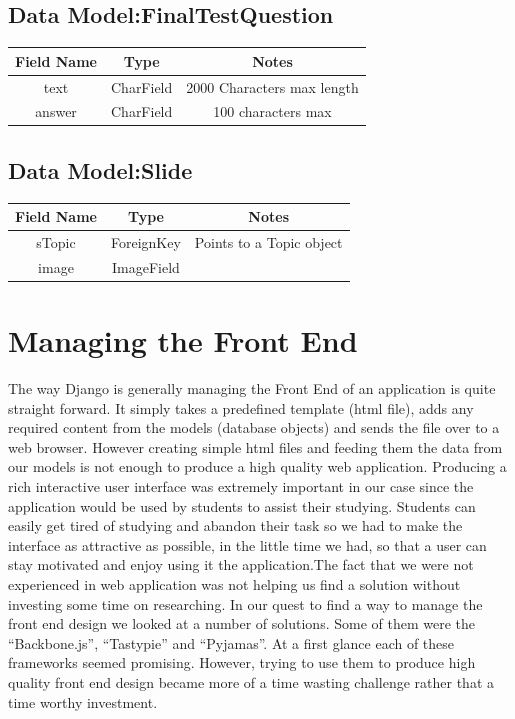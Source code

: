 \documentclass{l3proj}
\begin{document}
{\subsection{Data Model:FinalTestQuestion}
\begin{tabular}{|c|c|c|}
\hline \textbf{Field Name} & \textbf{Type} & \textbf{Notes}\\
\hline text & CharField & 2000 Characters max length \\ 
\hline answer & CharField & 100 characters max \\ \hline
\end{tabular}

\subsection{Data Model:Slide}
\begin{tabular}{|c|c|c|}
\hline \textbf{Field Name} & \textbf{Type} & \textbf{Notes}\\
\hline sTopic & ForeignKey & Points to a Topic object \\ 
\hline image & ImageField &  \\ \hline
\end{tabular}

\section{Managing the Front End}
The way Django is generally managing the Front End of an application is quite 
straight forward. It simply takes a predefined template (html file), adds any required 
content from the models (database objects) and sends the file over to a web browser. 
However creating simple html files and feeding them the data from our models is not 
enough to produce a high quality web application. Producing a rich interactive user interface was extremely important in our case since the application would be used by students to assist their studying. Students can easily get tired of studying and abandon their task so we had to make the interface as attractive as possible, in the little time we had, so that a user can stay motivated and enjoy using it the application.The fact that we were not 
experienced in web application was not helping us find a solution without investing 
some time on researching. In our quest to find a way to manage the front end design 
we looked at a number of solutions. Some of them were the ``Backbone.js'', ``Tastypie'' 
and ``Pyjamas''. At a first glance each of these frameworks seemed promising. 
However, trying to use them to produce high quality front end design became more of 
a time wasting challenge rather that a time worthy investment.
}
\end{document}
